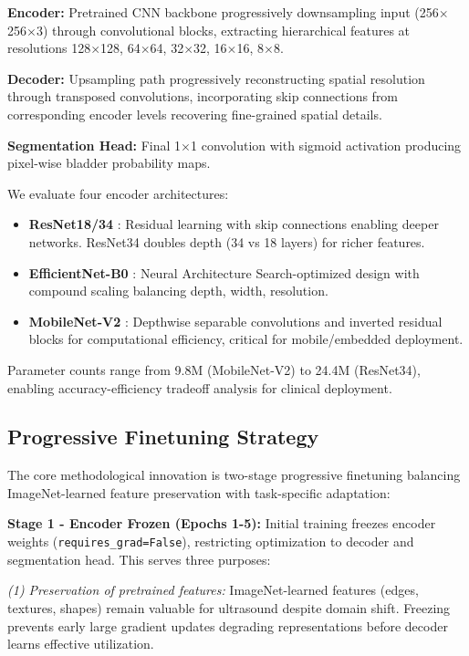 \documentclass{article}
\begin{document}
\textbf{Encoder:} Pretrained CNN backbone progressively downsampling input (256$\times$256$\times$3) through convolutional blocks, extracting hierarchical features at resolutions 128$\times$128, 64$\times$64, 32$\times$32, 16$\times$16, 8$\times$8.

\textbf{Decoder:} Upsampling path progressively reconstructing spatial resolution through transposed convolutions, incorporating skip connections from corresponding encoder levels recovering fine-grained spatial details.

\textbf{Segmentation Head:} Final 1$\times$1 convolution with sigmoid activation producing pixel-wise bladder probability maps.

We evaluate four encoder architectures:

\begin{itemize}
    \item \textbf{ResNet18/34} \cite{he2016deep}: Residual learning with skip connections enabling deeper networks. ResNet34 doubles depth (34 vs 18 layers) for richer features.
    \item \textbf{EfficientNet-B0} \cite{tan2019efficientnet}: Neural Architecture Search-optimized design with compound scaling balancing depth, width, resolution.
    \item \textbf{MobileNet-V2} \cite{sandberg2018mobilenetv2}: Depthwise separable convolutions and inverted residual blocks for computational efficiency, critical for mobile/embedded deployment.
\end{itemize}

Parameter counts range from 9.8M (MobileNet-V2) to 24.4M (ResNet34), enabling accuracy-efficiency tradeoff analysis for clinical deployment.

\subsection{Progressive Finetuning Strategy}

The core methodological innovation is two-stage progressive finetuning balancing ImageNet-learned feature preservation with task-specific adaptation:

\textbf{Stage 1 - Encoder Frozen (Epochs 1-5):}
Initial training freezes encoder weights (\texttt{requires\_grad=False}), restricting optimization to decoder and segmentation head. This serves three purposes:

\textit{(1) Preservation of pretrained features:} ImageNet-learned features (edges, textures, shapes) remain valuable for ultrasound despite domain shift. Freezing prevents early large gradient updates degrading representations before decoder learns effective utilization.
\end{document}
